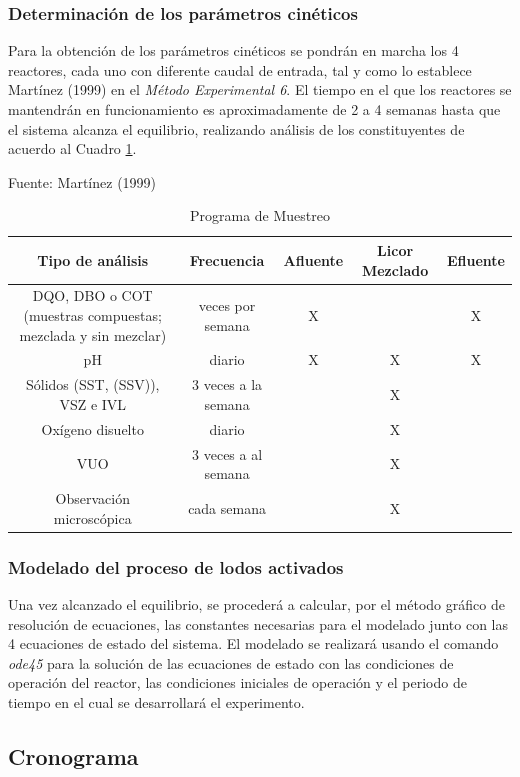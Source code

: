 \subsubsection*{Determinación de los parámetros cinéticos}
Para la obtención de los parámetros cinéticos se pondrán en marcha los 4 reactores, cada uno con diferente caudal de entrada, tal y como lo establece Martínez (1999) \citep{delgadillo} en el \emph{Método Experimental 6}. El tiempo en el que los reactores se mantendrán en funcionamiento es aproximadamente de 2 a 4 semanas hasta que el sistema alcanza el equilibrio, realizando análisis de los constituyentes de acuerdo al Cuadro \ref{tab:muestreo}.\par
	\begin{table}[!h]
		\begin{center}
		\caption{Programa de Muestreo}
		\label{tab:muestreo}
		\small{Fuente: Martínez (1999)}
		\begin{footnotesize}
			\begin{tabular}{|c|c|c|c|c|}
			\hline
			\rowcolor{blanc}
			Tipo de análisis & Frecuencia & Afluente & \multicolumn{1}{|m{2cm}|}{\centering Licor Mezclado} & Efluente \\
			\hline
			\multicolumn{1}{|m{5cm}|}{\centering DQO, DBO o COT (muestras compuestas; mezclada y sin mezclar)} & \multicolumn{1}{m{3cm}|}{\centering 3 veces por semana} & \multicolumn{1}{m{1.5cm}|}{\centering X} & \multicolumn{1}{m{2cm}|}{\centering } & \multicolumn{1}{m{1.5cm}|}{\centering X} \\
			\hline
			pH & diario & X & X & X \\
			\hline
			Sólidos (SST, (SSV)), VSZ e IVL & 3 veces a la semana & & X & \\
			\hline
			Oxígeno disuelto & diario & & X & \\
			\hline
			VUO & 3 veces a al semana & & X & \\
			\hline
			Observación microscópica & cada semana & & X & \\
			\hline
			\end{tabular}
		\end{footnotesize}
		\end{center}
	\end{table}

\subsubsection*{Modelado del proceso de lodos activados}
Una vez alcanzado el equilibrio, se procederá a calcular, por el método gráfico de resolución de ecuaciones, las constantes necesarias para el modelado junto con las 4 ecuaciones de estado del sistema. El modelado se realizará usando el comando \emph{ode45} para la solución de las ecuaciones de estado con las condiciones de operación del reactor, las condiciones iniciales de operación y el periodo de tiempo en el cual se desarrollará el experimento.

\subsection*{Cronograma}
